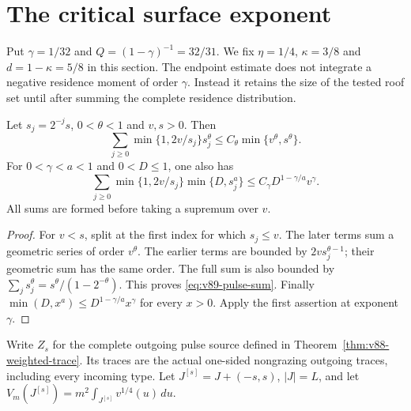 \section{The critical surface exponent}
\label{sec:v89-critical-surface}
Put $\gamma=1/32$ and $Q=(1-\gamma)^{-1}=32/31$. We fix
$\eta=1/4$, $\kappa=3/8$ and $d=1-\kappa=5/8$ in this section.
The endpoint estimate does not integrate a negative residence moment
of order $\gamma$. Instead it retains the size of the tested roof set
until after summing the complete residence distribution.

\begin{lemma}\label{lem:v89-pulse-sum}
Let $s_j=2^{-j}s$, $0<\theta<1$ and $v,s>0$. Then
\begin{equation}\label{eq:v89-pulse-sum}
 \sum_{j\ge0}\min\{1,2v/s_j\}s_j^\theta
                 \le C_\theta\min\{v^\theta,s^\theta\}.
\end{equation}
For $0<\gamma<a<1$ and $0<D\le1$, one also has
\begin{equation}\label{eq:v89-capped-sum}
 \sum_{j\ge0}\min\{1,2v/s_j\}\min\{D,s_j^a\}
                 \le C_\gamma D^{1-\gamma/a}v^\gamma.
\end{equation}
All sums are formed before taking a supremum over $v$.
\end{lemma}
\begin{proof}
For $v<s$, split at the first index for which $s_j\le v$.
The later terms sum a geometric series of order $v^\theta$.
The earlier terms are bounded by $2v s_j^{\theta-1}$; their
geometric sum has the same order. The full sum is also bounded by
$\sum_j s_j^\theta=s^\theta/(1-2^{-\theta})$. This proves
\eqref{eq:v89-pulse-sum}. Finally
$\min(D,x^a)\le D^{1-\gamma/a}x^\gamma$ for every $x>0$.
Apply the first assertion at exponent $\gamma$.
\end{proof}

Write $Z_s$ for the complete outgoing pulse source defined in
Theorem~\ref{thm:v88-weighted-trace}. Its traces are the actual
one-sided nongrazing outgoing traces, including every incoming type.
Let $J^{[s]}=J+(-s,s)$, $|J|=L$, and let
$V_m(J^{[s]})=m^2\int_{J^{[s]}}v^{1/4}(u)\,du$.

